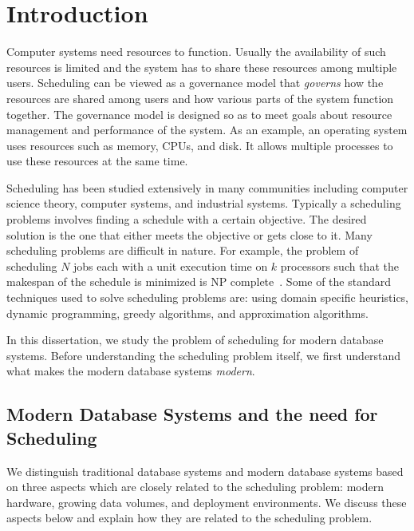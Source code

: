 \chapter{Introduction}
Computer systems need resources to function. 
Usually the availability of such resources is limited and the system has to share these resources among multiple users. 
Scheduling can be viewed as a governance model that \textit{governs} how the resources are shared among users and how various parts of the system function together. 
The governance model is designed so as to meet goals about resource management and performance of the system. 
As an example, an operating system uses resources such as memory, CPUs, and disk.
It allows multiple processes to use these resources at the same time. 

Scheduling has been studied extensively in many communities including computer science theory, computer systems, and industrial systems. 
Typically a scheduling problems involves finding a schedule with a certain objective.
The desired solution is the one that either meets the objective or gets close to it.
Many scheduling problems are difficult in nature.
For example, the problem of scheduling $N$ jobs each with a unit execution time on $k$ processors such that the makespan of the schedule is minimized is NP complete~\cite{ULLMAN1975384}.
Some of the standard techniques used to solve scheduling problems are: using domain specific heuristics, dynamic programming, greedy algorithms, and approximation algorithms. 

In this dissertation, we study the problem of scheduling for modern database systems.
Before understanding the scheduling problem itself, we first understand what makes the modern database systems \textit{modern}.

\section{Modern Database Systems and the need for Scheduling}
We distinguish traditional database systems and modern database systems based on three aspects which are closely related to the scheduling problem: modern hardware, growing data volumes, and deployment environments.
We discuss these aspects below and explain how they are related to the scheduling problem. 
